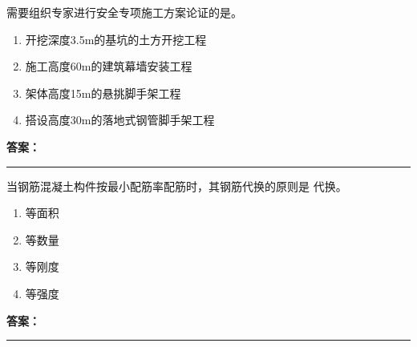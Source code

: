 \documentclass[UTF8,fontset=fandol,11pt]{ctexart}
\newcommand{\answerline}{\textcolor{answerred}{\rule{2.4cm}{0.7pt}}}
\begin{document}
\begin{quizbox}[title={乱序第 87 题｜第七章脚手架工程}]

需要组织专家进行安全专项施工方案论证的是。\\

\begin{enumerate}[label=\Alph*.]

\item 开挖深度3.5m的基坑的土方开挖工程

\item 施工高度60m的建筑幕墙安装工程

\item 架体高度15m的悬挑脚手架工程

\item 搭设高度30m的落地式钢管脚手架工程

\end{enumerate}

\textbf{\textcolor{answerred}{答案：}} \answerline

\end{quizbox}

\vspace{0.2em}

\begin{quizbox}[title={乱序第 88 题｜第四章混凝土结构工程}]

当钢筋混凝土构件按最小配筋率配筋时，其钢筋代换的原则是 代换。\\

\begin{enumerate}[label=\Alph*.]

\item 等面积

\item 等数量

\item 等刚度

\item 等强度

\end{enumerate}

\textbf{\textcolor{answerred}{答案：}} \answerline

\end{quizbox}

\vspace{0.2em}
\end{document}
